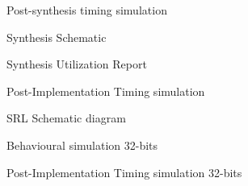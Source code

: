 \documentclass[CMPE]{../KGCOEReport}
\begin{document}
    \begin{figure}[h!]
        \centering
        \caption{Post-synthesis timing simulation}
        \label{fig:demo2}
    \end{figure}
    \begin{figure}[h!]
        \centering
        \caption{Synthesis Schematic}
        \label{fig:demo3}
    \end{figure}
    \begin{figure}[h!]
        \centering
        \caption{Synthesis Utilization Report}
        \label{fig:demo4}
    \end{figure}
    \begin{figure}[h!]
        \centering
        \caption{Post-Implementation Timing simulation}
        \label{fig:demo5}
    \end{figure}
    \begin{figure}[h!]
        \centering
        \caption{SRL Schematic diagram}
        \label{fig:demo6}
    \end{figure}
    \begin{figure}[h!]
        \centering
        \caption{Behavioural simulation 32-bits}
        \label{fig:demo7}
    \end{figure}
    \begin{figure}[h!]
        \centering
        \caption{Post-Implementation Timing simulation 32-bits}
        \label{fig:demo8}
    \end{figure}
\end{document}
